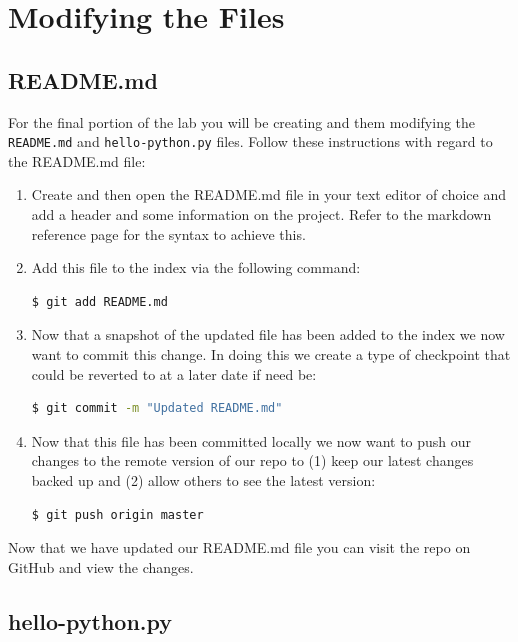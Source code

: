 \documentclass[a4paper,10pt]{article} %
\begin{document}
\section{Modifying the Files}

\subsection{README.md}

For the final portion of the lab you will be creating and them modifying the \lstinline|README.md| and \lstinline|hello-python.py| files. Follow these instructions with regard to the README.md file:
\begin{enumerate}
  \item Create and then open the README.md file in your text editor of choice and add a header and some information on the project. Refer to the markdown reference page for the syntax to achieve this.
  \item Add this file to the index via the following command:
\begin{lstlisting}[language=bash]
$ git add README.md
\end{lstlisting}
  \item Now that a snapshot of the updated file has been added to the index we now want to commit this change. In doing this we create a type of checkpoint that could be reverted to at a later date if need be:
\begin{lstlisting}[language=bash]
$ git commit -m "Updated README.md"
\end{lstlisting}
\item Now that this file has been committed locally we now want to push our changes to the remote version of our repo to (1) keep our latest changes backed up and (2) allow others to see the latest version:
\begin{lstlisting}[language=bash]
$ git push origin master
\end{lstlisting}
\end{enumerate}

Now that we have updated our README.md file you can visit the repo on GitHub and view the changes.

\subsection{hello-python.py}
\end{document}
